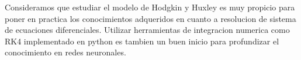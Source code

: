 \documentclass[aps,prl,twocolumn,groupedaddress]{revtex4-2}
\begin{document}
Consideramos que estudiar el modelo de Hodgkin y Huxley es muy propicio para poner en practica los conocimientos adqueridos en cuanto a resolucion de sistema de ecuaciones diferenciales. Utilizar herramientas de integracion numerica como RK4 implementado en python es tambien un buen inicio para profundizar el conocimiento en redes neuronales.



%



%
\end{document}
